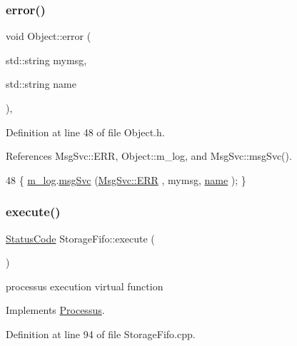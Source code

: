 \subsubsection{\texorpdfstring{error()}{error()}\hspace{0.1cm}{\footnotesize\ttfamily [2/2]}}
{\footnotesize\ttfamily void Object\+::error (\begin{DoxyParamCaption}\item[{std\+::string}]{mymsg,  }\item[{std\+::string}]{name }\end{DoxyParamCaption})\hspace{0.3cm}{\ttfamily [inline]}, {\ttfamily [inherited]}}



Definition at line 48 of file Object.\+h.



References Msg\+Svc\+::\+E\+RR, Object\+::m\+\_\+log, and Msg\+Svc\+::msg\+Svc().


\begin{DoxyCode}
48 \{ \hyperlink{classObject_a0d269813dd7ac1f24bc143031e2963f2}{m\_log}.\hyperlink{classMsgSvc_ad25f18047920cc59a314e5098259711c}{msgSvc} (\hyperlink{classMsgSvc_ae671eb7301996cd049d2da8a65925926a35a9d7166e9896af4ec8fb33bf5f1772}{MsgSvc::ERR}     , mymsg, \hyperlink{classObject_a300f4c05dd468c7bb8b3c968868443c1}{name} ); \}
\end{DoxyCode}
\mbox{\label{classStorageFifo_aa6826007c79ce353640fd1b1836807ff}} 
\subsubsection{\texorpdfstring{execute()}{execute()}}
{\footnotesize\ttfamily \hyperlink{classStatusCode}{Status\+Code} Storage\+Fifo\+::execute (\begin{DoxyParamCaption}{ }\end{DoxyParamCaption})\hspace{0.3cm}{\ttfamily [virtual]}}

processus execution virtual function 

Implements \hyperlink{classProcessus_a63767a63a1fb0055c5aa45b21a4a5d58}{Processus}.



Definition at line 94 of file Storage\+Fifo.\+cpp.



